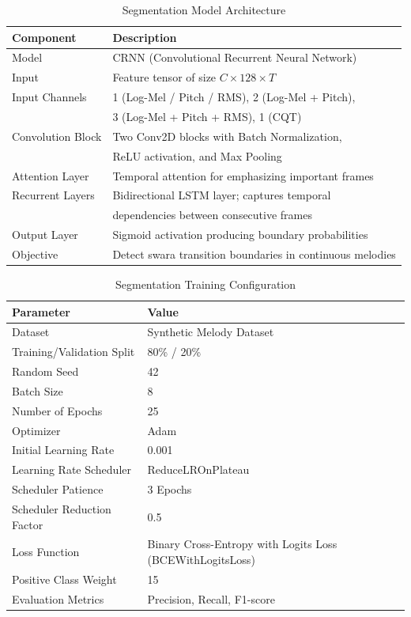 \begin{table}[H]
\centering
\caption{Segmentation Model Architecture}
\label{tab:segmentation-arch}
\begin{tabular}{ll}
\toprule
\textbf{Component} & \textbf{Description} \\
\midrule
Model & CRNN (Convolutional Recurrent Neural Network) \\
Input & Feature tensor of size $C \times 128 \times T$ \\
Input Channels & 1 (Log-Mel / Pitch / RMS), 2 (Log-Mel + Pitch), \\
 & 3 (Log-Mel + Pitch + RMS), 1 (CQT) \\
Convolution Block & Two Conv2D blocks with Batch Normalization, \\
 & ReLU activation, and Max Pooling \\
Attention Layer & Temporal attention for emphasizing important frames \\
Recurrent Layers & Bidirectional LSTM layer; captures temporal \\
 & dependencies between consecutive frames \\
Output Layer & Sigmoid activation producing boundary probabilities \\
Objective & Detect swara transition boundaries in continuous melodies \\
\bottomrule
\end{tabular}
\end{table}

\begin{table}[H]
\centering
\caption{Segmentation Training Configuration}
\label{tab:segmentation-training}
\begin{tabular}{ll}
\toprule
\textbf{Parameter} & \textbf{Value} \\
\midrule
Dataset & Synthetic Melody Dataset \\
Training/Validation Split & 80\% / 20\% \\
Random Seed & 42 \\
Batch Size & 8 \\
Number of Epochs & 25 \\
Optimizer & Adam \\
Initial Learning Rate & 0.001 \\
Learning Rate Scheduler & ReduceLROnPlateau \\
Scheduler Patience & 3 Epochs \\
Scheduler Reduction Factor & 0.5 \\
Loss Function & Binary Cross-Entropy with Logits Loss (BCEWithLogitsLoss) \\
Positive Class Weight & 15 \\
Evaluation Metrics & Precision, Recall, F1-score \\
\bottomrule
\end{tabular}
\end{table}

